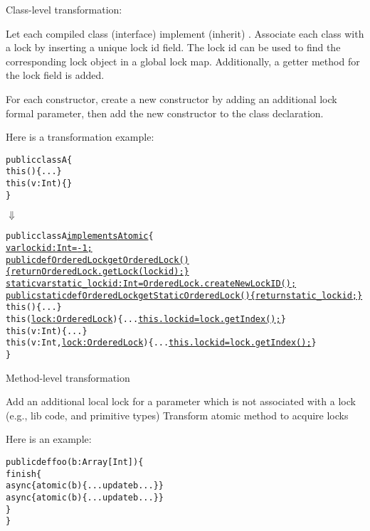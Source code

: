 \documentclass{article}
\begin{document}
\begin{enumerate}

\Item Class-level transformation:
\begin{itemize}
\Item Let each compiled class (interface) implement (inherit) .
\Item Associate each class with a lock by inserting  a unique lock id field. The lock id can be used to find the corresponding lock object in a global lock map.  Additionally, a getter method for the lock field is added.

\Item For each constructor, create a new constructor by adding an additional lock formal parameter, then add the new constructor to the class declaration.

Here is a transformation example:
\begin{CodeOut}
\begin{alltt}
public class A \{
   this() \{...\}
   this(v:Int) \{\}
\}
\end{alltt}
\end{CodeOut}

\hspace{10mm}$\Downarrow$

\begin{CodeOut}
\begin{alltt}
public class A \underline{implements Atomic} \{
   \underline{var lockid:Int = -1;}
   \underline{public def OrderedLock getOrderedLock() \{ return OrderedLock.getLock(lockid);\}}
   \underline{static var static\_lockid:Int = OrderedLock.createNewLockID();}
   \underline{public static def OrderedLock getStaticOrderedLock() \{ return static\_lockid;\}}
   this() \{...\}
   this(\underline{lock:OrderedLock}) \{... \underline{this.lockid = lock.getIndex();}\}
   this(v:Int) \{...\}
   this(v:Int, \underline{lock:OrderedLock}) \{... \underline{this.lockid = lock.getIndex();}\}
\}
\end{alltt}
\end{CodeOut}
\end{itemize}

\Item Method-level transformation

\begin{itemize}
\Item Add an additional local lock for a parameter which is not associated with a lock (e.g., lib code, and primitive types)
\Item Transform atomic method to acquire locks

Here is an example:
\begin{CodeOut}
\begin{alltt}
public def foo(b:Array[Int]) \{
    finish \{
       async \{atomic(b) \{...update b... \}\}
       async \{atomic(b) \{...update b... \}\}
    \}
\}
\end{alltt}
\end{CodeOut}


\end{itemize}
\end{enumerate}
\end{document}
